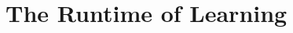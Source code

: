 \chapter{The Runtime of Learning}

\begin{ex}
\end{ex}

\begin{ex}
\end{ex}

\begin{ex}
\end{ex}

\begin{ex}
\end{ex}